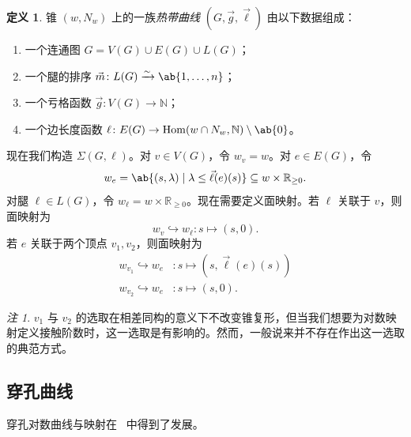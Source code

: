 \documentclass{amsart}
\theoremstyle{definition}
\newtheorem{defn}[thm]{定义}
\theoremstyle{remark}
\newtheorem{rmk}[thm]{注}
\theoremstyle{plain}
\theoremstyle{definition}
\theoremstyle{remark}
\newcommand{\N}{\mathbb{N}}
\newcommand{\R}{\mathbb{R}}
\newcommand{\1}{\mathbf{1}}
\newcommand{\2}{\mathbf{2}}
\newcommand{\3}{\mathbf{3}}
\DeclareMathOperator{\Hom}{Hom}
\begin{document}
\begin{defn}
    锥 \((w, N_w)\) 上的一族\textit{热带曲线} \((G, \vec{g}, \vec{\ell})\) 由以下数据组成：
    \begin{enumerate}
        \item 一个连通图 \(G = V(G) \cup E(G) \cup L(G)\)；
        \item 一个腿的排序 \(\vec{m} \colon L(G) \xrightarrow{\sim} \ab\{1, \ldots, n\}\)；
        \item 一个亏格函数 \(\vec{g} \colon V(G) \to \N\)；
        \item 一个边长度函数 \(\ell \colon E(G) \to \Hom(w \cap N_w, \N) \setminus \ab\{0\}\)。
    \end{enumerate}
\end{defn}

现在我们构造 \(\Sigma(G, \ell)\)。对 \(v \in V(G)\)，令 \(w_v = w\)。对 \(e \in E(G)\)，令
\[ w_e = \ab\{ (s, \lambda) \mid \lambda \leq \vec{\ell}(e)(s) \} \subseteq w \times \R_{\geq 0}. \]
对腿 \(\ell \in L(G)\)，令 \(w_{\ell} = w \times \R_{\geq 0}\)。现在需要定义面映射。若 \(\ell\) 关联于 \(v\)，则面映射为
\[ w_v \hookrightarrow w_{\ell} \colon s \mapsto (s, 0). \]
若 \(e\) 关联于两个顶点 \(v_1, v_2\)，则面映射为
\begin{align*}
    w_{v_1} \hookrightarrow w_e &\colon s \mapsto (s, \vec{\ell}(e)(s)) \\
    w_{v_2} \hookrightarrow w_e & \colon s \mapsto (s, 0).
\end{align*}
\begin{rmk}
    \(v_1\) 与 \(v_2\) 的选取在相差同构的意义下不改变锥复形，但当我们想要为对数映射定义接触阶数时，这一选取是有影响的。然而，一般说来并不存在作出这一选取的典范方式。
\end{rmk}

\subsection{穿孔曲线}%
\label{sub:Punctured curves}

穿孔对数曲线与映射在~\cite{ACGS2025} 中得到了发展。
\end{document}
